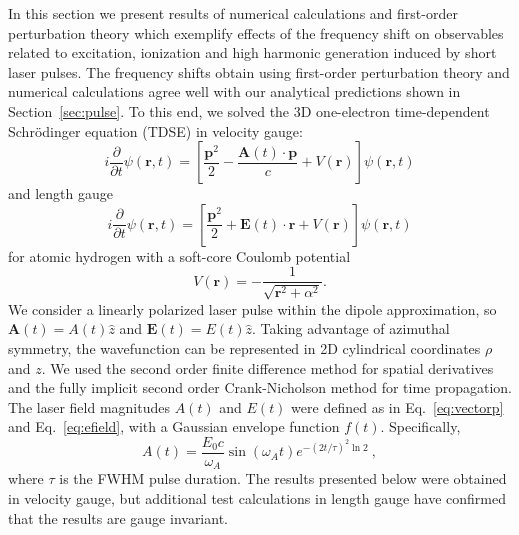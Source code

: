 In this section we present results of numerical calculations and first-order perturbation theory which exemplify effects of the frequency shift on observables related to excitation, ionization and high harmonic generation induced by short laser pulses. The frequency shifts obtain using first-order perturbation theory and numerical calculations agree well with our analytical predictions shown in 
Section~\ref{sec:pulse}. To this end, we solved the 3D one-electron time-dependent Schr\"odinger equation (TDSE) in velocity gauge:
\begin{equation}
i\frac{\partial}{\partial t}\psi(\mathbf{r},t) = \left[\frac{\mathbf{p}^2}{2} - \frac{\mathbf{A}(t) \cdot \mathbf{p}}{c} + V(\mathbf{r})\right]\psi(\mathbf{r},t)
\end{equation}
and length gauge
\begin{equation}
i\frac{\partial}{\partial t}\psi(\mathbf{r},t) = \left[\frac{\mathbf{p}^2}{2} + \mathbf{E}(t) \cdot \mathbf{\mathbf{r}} + V(\mathbf{r})\right]\psi(\mathbf{r},t)
\end{equation}
for atomic hydrogen with a soft-core Coulomb potential
\begin{equation}
V(\mathbf{r}) = -\frac{1}{\sqrt{\mathbf{r}^2+\alpha ^2}}.
\end{equation}
We consider a linearly polarized laser pulse within the dipole approximation, so $\mathbf{A}(t)=A(t)\hat{z}$ and $\mathbf{E}(t)=E(t)\hat{z}$. Taking advantage of azimuthal symmetry, the wavefunction can be represented in 2D cylindrical coordinates $\rho$ and $z$. We used the second order finite difference method for spatial derivatives and the fully implicit second order Crank-Nicholson method for time propagation.
The laser field magnitudes $A(t)$ and $E(t)$ were defined as in Eq.~\ref{eq:vectorp} and Eq.~\ref{eq:efield}, with a Gaussian envelope function $f(t)$.
Specifically,
\begin{equation}
\label{eq:numericalVecPot}
A(t) = \frac{E_0c}{\omega_A}\sin(\omega_A t)e^{-(2t/\tau)^2\ln 2} ~,
\end{equation}
where $\tau$ is the FWHM pulse duration. The results presented below were obtained in velocity gauge, but additional test calculations in length gauge have confirmed that the results are gauge invariant.

